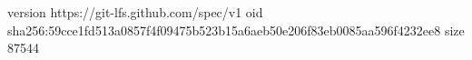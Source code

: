 version https://git-lfs.github.com/spec/v1
oid sha256:59cce1fd513a0857f4f09475b523b15a6aeb50e206f83eb0085aa596f4232ee8
size 87544
